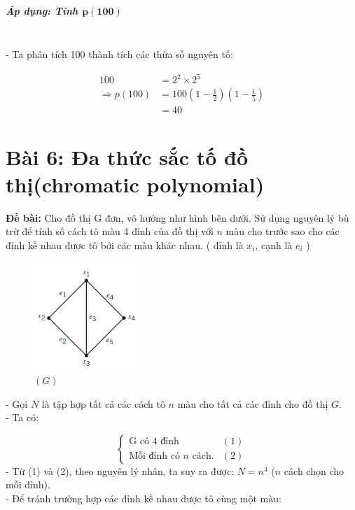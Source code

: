 \documentclass[12pt]{article}
\begin{document}
\begin{sloppypar}
\subparagraph{Áp dụng: Tính \(\mathbf{p(100)}\) } \mbox{}\\

- Ta phân tích 100 thành tích các thừa số nguyên tố:

\begin{align*}
    100 & = 2^{2}\times 2^{5} \\
    \Rightarrow p(100) & = 100\left(1 - \frac{1}{2}\right)\left(1-\frac{1}{5}\right) \\
    & = 40
\end{align*}

\section{Bài 6: Đa thức sắc tố đồ thị(chromatic polynomial)}
\begin{tcolorbox}
    \textbf{Đề bài:} Cho đồ thị G đơn, vô hướng như hình bên dưới.  Sử dụng nguyên lý bù trừ để tính số cách tô màu 4 đỉnh của đồ thị với  \(n\) màu cho trước sao cho các đỉnh kề nhau được tô bởi các màu khác nhau. ( đỉnh là \(x_{i}\), cạnh là \(e_{i}\) )
\end{tcolorbox}

\begin{figure}[H]
    \centering
    \includegraphics[width=4cm]{ex6.png}
    \captionsetup{labelformat=empty}
    \caption{\((G)\)}   
  \end{figure}
  

- Gọi \(N\) là tập hợp tất cả các cách tô \(n\) màu cho tất cả các đỉnh cho đồ thị \(G\). \\
- Ta có:

\[
    \begin{cases}
       \text{G có 4 đỉnh} & (1)\\
       \text{Mỗi đỉnh có } n \text{ cách.} & (2)
    \end{cases}
    \]
- Từ (1) và (2), theo nguyên lý nhân, ta suy ra được: \(N = n^{4}\) (\(n\) cách chọn cho mỗi đỉnh). \\
- Để tránh trường hợp các đỉnh kề nhau được tô cùng một màu:


\end{sloppypar}
\end{document}
